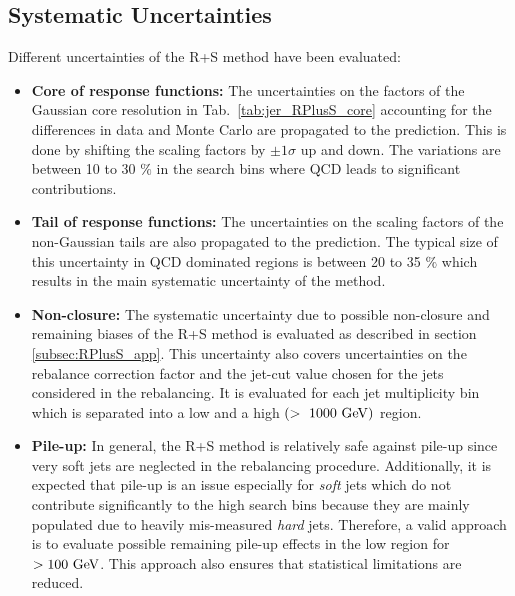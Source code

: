 \subsection{Systematic Uncertainties}
\label{subsec:RA2_syst_unc}
Different uncertainties of the R+S method have been evaluated:
\begin{itemize}
\item \textbf{Core of response functions:} The uncertainties on the factors of the Gaussian core resolution in Tab.~\ref{tab:jer_RPlusS_core} accounting for the differences in data and Monte Carlo are propagated to the prediction. This is done by shifting the scaling factors by $\pm 1\sigma$ up and down. The variations are between 10 to 30 $\%$ in the search bins where QCD leads to significant contributions.
\item \textbf{Tail of response functions:} The uncertainties on the scaling factors of the non-Gaussian tails are also propagated to the prediction. The typical size of this uncertainty in QCD dominated regions is between 20 to 35 $\%$ which results in the main systematic uncertainty of the method. 
\item \textbf{Non-closure:} The systematic uncertainty due to possible non-closure and remaining biases of the R+S method is evaluated as described in section \ref{subsec:RPlusS_app}. This uncertainty also covers uncertainties on the rebalance correction factor and the jet-\pt cut value chosen for the jets considered in the rebalancing. It is evaluated for each jet multiplicity bin which is separated into a low and a high \HT $(>~1000~\rm{GeV})$ region.
\item \textbf{Pile-up:} In general, the R+S method is relatively safe against pile-up since very soft jets are neglected in the rebalancing procedure. Additionally, it is expected that pile-up is an issue especially for \textit{soft} jets which do not contribute significantly to the high \MHT search bins because they are mainly populated due to heavily mis-measured \textit{hard} jets. Therefore, a valid approach is to evaluate possible remaining pile-up effects in the low \MHT region for \MHT $> 100 \rm{~GeV}$. This approach also ensures that statistical limitations are reduced.\\

\end{itemize}
